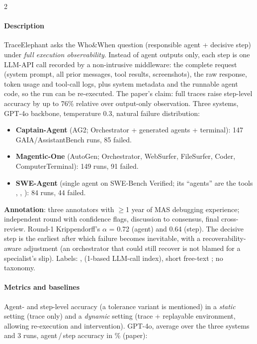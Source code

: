 \begin{multicols}{2}
\paragraph{Description} TraceElephant asks the Who\&When question (responsible agent + decisive step) under \emph{full execution observability}. Instead of agent outputs only, each step is one LLM-API call recorded by a non-intrusive middleware: the complete request (system prompt, all prior messages, tool results, screenshots), the raw response, token usage and tool-call logs, plus system metadata and the runnable agent code, so the run can be re-executed. The paper's claim: full traces raise step-level accuracy by up to 76\% relative over output-only observation. Three systems, GPT-4o backbone, temperature 0.3, natural failure distribution:
\begin{itemize}
\item \textbf{Captain-Agent} (AG2; Orchestrator + generated  agents + terminal): 147 GAIA/AssistantBench runs, 85 failed.
\item \textbf{Magentic-One} (AutoGen; Orchestrator, WebSurfer, FileSurfer, Coder, ComputerTerminal): 149 runs, 91 failed.
\item \textbf{SWE-Agent} (single agent on SWE-Bench Verified; its ``agents'' are the tools , , ): 84 runs, 44 failed.
\end{itemize}
\textbf{Annotation}: three annotators with $\ge$1 year of MAS debugging experience; independent round with confidence flags, discussion to consensus, final cross-review. Round-1 Krippendorff's $\alpha$ = 0.72 (agent) and 0.64 (step). The decisive step is the earliest after which failure becomes inevitable, with a recoverability-aware adjustment (an orchestrator that could still recover is not blamed for a specialist's slip). Labels: ,  (1-based LLM-call index), short free-text ; no taxonomy.

\paragraph{Metrics and baselines} Agent- and step-level accuracy (a tolerance variant is mentioned) in a \emph{static} setting (trace only) and a \emph{dynamic} setting (trace + replayable environment, allowing re-execution and intervention). GPT-4o, average over the three systems and 3 runs, agent\,/\,step accuracy in \% (paper):


\end{multicols}
